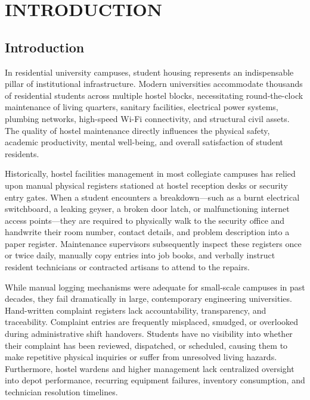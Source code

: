 \documentclass[10pt]{report}
\begin{document}
\newpage
\renewcommand*\contentsname{TABLE OF CONTENTS}
\tableofcontents
{}
\thispagestyle{empty}

\chapter{INTRODUCTION}
\linespread{1.5}

\section{Introduction}
\hspace{0.5cm}In residential university campuses, student housing represents an indispensable pillar of institutional infrastructure. Modern universities accommodate thousands of residential students across multiple hostel blocks, necessitating round-the-clock maintenance of living quarters, sanitary facilities, electrical power systems, plumbing networks, high-speed Wi-Fi connectivity, and structural civil assets. The quality of hostel maintenance directly influences the physical safety, academic productivity, mental well-being, and overall satisfaction of student residents. 

Historically, hostel facilities management in most collegiate campuses has relied upon manual physical registers stationed at hostel reception desks or security entry gates. When a student encounters a breakdown---such as a burnt electrical switchboard, a leaking geyser, a broken door latch, or malfunctioning internet access points---they are required to physically walk to the security office and handwrite their room number, contact details, and problem description into a paper register. Maintenance supervisors subsequently inspect these registers once or twice daily, manually copy entries into job books, and verbally instruct resident technicians or contracted artisans to attend to the repairs. 

While manual logging mechanisms were adequate for small-scale campuses in past decades, they fail dramatically in large, contemporary engineering universities. Hand-written complaint registers lack accountability, transparency, and traceability. Complaint entries are frequently misplaced, smudged, or overlooked during administrative shift handovers. Students have no visibility into whether their complaint has been reviewed, dispatched, or scheduled, causing them to make repetitive physical inquiries or suffer from unresolved living hazards. Furthermore, hostel wardens and higher management lack centralized oversight into depot performance, recurring equipment failures, inventory consumption, and technician resolution timelines. 
\end{document}
